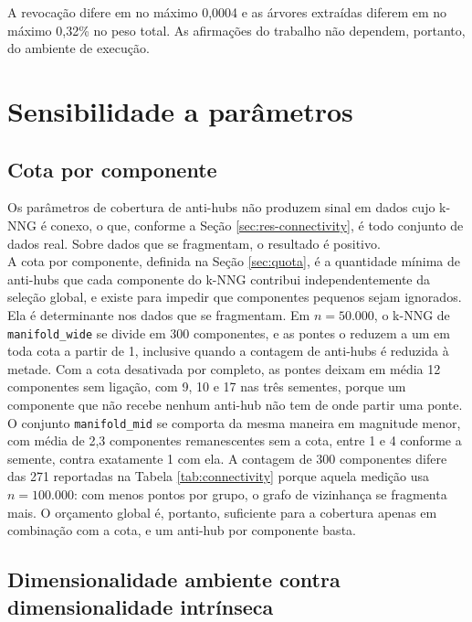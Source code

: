 A revocação difere em no máximo 0,0004 e as árvores extraídas diferem em no máximo 0,32\% no peso total. As afirmações do trabalho não dependem, portanto, do ambiente de execução.\\

\section{Sensibilidade a parâmetros\label{sec:res-sensitivity}}

\subsection{Cota por componente\label{sec:res-quota}}

Os parâmetros de cobertura de anti-hubs não produzem sinal em dados cujo \ac{k-NNG} é conexo, o que, conforme a Seção \ref{sec:res-connectivity}, é todo conjunto de dados real. Sobre dados que se fragmentam, o resultado é positivo.\\

A cota por componente, definida na Seção \ref{sec:quota}, é a quantidade mínima de anti-hubs que cada componente do \ac{k-NNG} contribui independentemente da seleção global, e existe para impedir que componentes pequenos sejam ignorados. Ela é determinante nos dados que se fragmentam. Em $n = 50.000$, o \ac{k-NNG} de \texttt{manifold\_wide} se divide em 300 componentes, e as pontes o reduzem a um em toda cota a partir de 1, inclusive quando a contagem de anti-hubs é reduzida à metade. Com a cota desativada por completo, as pontes deixam em média 12 componentes sem ligação, com 9, 10 e 17 nas três sementes, porque um componente que não recebe nenhum anti-hub não tem de onde partir uma ponte. O conjunto \texttt{manifold\_mid} se comporta da mesma maneira em magnitude menor, com média de 2,3 componentes remanescentes sem a cota, entre 1 e 4 conforme a semente, contra exatamente 1 com ela. A contagem de 300 componentes difere das 271 reportadas na Tabela \ref{tab:connectivity} porque aquela medição usa $n = 100.000$: com menos pontos por grupo, o grafo de vizinhança se fragmenta mais. O orçamento global é, portanto, suficiente para a cobertura apenas em combinação com a cota, e um anti-hub por componente basta.\\

\subsection{Dimensionalidade ambiente contra dimensionalidade intrínseca\label{sec:res-dimension}}

